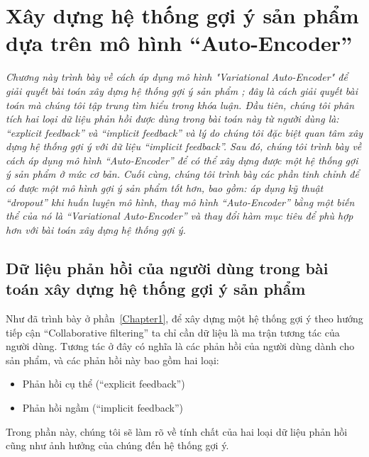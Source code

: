 \chapter{Xây dựng hệ thống gợi ý sản phẩm dựa trên mô hình ``Auto-Encoder''}
\graphicspath{{Chapter3/Chapter3Figs}}
\label{Chapter3}

\textit{Chương này trình bày về cách áp dụng mô hình "Variational Auto-Encoder" để giải quyết bài toán xây dựng hệ thống gợi ý sản phẩm \cite{mvae}; đây là cách giải quyết bài toán mà chúng tôi tập trung tìm hiểu trong khóa luận. 
Đầu tiên, chúng tôi phân tích hai loại dữ liệu phản hồi được dùng trong bài toán này từ người dùng là:
``explicit feedback'' và ``implicit feedback'' và lý do chúng tôi đặc biệt quan tâm xây dựng hệ thống gợi ý với dữ liệu ``implicit feedback''.
Sau đó, chúng tôi trình bày về cách áp dụng mô hình ``Auto-Encoder'' để có thể xây dựng được một hệ thống gợi ý sản phẩm ở mức cơ bản. 
Cuối cùng, chúng tôi trình bày các phần tinh chỉnh để có được một mô hình gợi ý sản phẩm tốt hơn, bao gồm: áp dụng kỹ thuật ``dropout'' khi huấn luyện mô hình, thay mô hình ``Auto-Encoder'' bằng một biến thể của nó là ``Variational Auto-Encoder'' và thay đổi hàm mục tiêu để phù hợp hơn với bài toán xây dựng hệ thống gợi ý.}


\section{Dữ liệu phản hồi của người dùng trong bài toán xây dựng hệ thống gợi ý sản phẩm}
    Như đã trình bày ở phần~\ref{Chapter1}, để xây dựng một hệ thống gợi ý 
    theo hướng tiếp cận ``Collaborative filtering'' ta chỉ cần dữ liệu là ma trận tương tác của người dùng.
    Tương tác ở đây có nghĩa là các phản hồi của người dùng dành cho sản phẩm, và các phản hồi này bao gồm hai loại:
    \begin{itemize}
        \item Phản hồi cụ thể (``explicit feedback'')
        \item Phản hồi ngầm (``implicit feedback'')
    \end{itemize}
    Trong phần này, chúng tôi sẽ làm rõ về tính chất của hai loại dữ liệu phản hồi cũng như ảnh hưởng của chúng đến hệ thống gợi ý.
